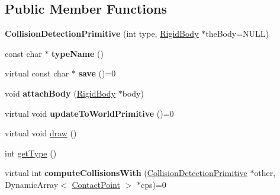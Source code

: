 \subsection*{Public Member Functions}
\begin{DoxyCompactItemize}
\item 
\hypertarget{classCartWheel_1_1Physics_1_1CollisionDetectionPrimitive_a97bb80333715080e870b264d35f5e070}{
{\bfseries CollisionDetectionPrimitive} (int type, \hyperlink{classCartWheel_1_1Physics_1_1RigidBody}{RigidBody} $\ast$theBody=NULL)}
\label{classCartWheel_1_1Physics_1_1CollisionDetectionPrimitive_a97bb80333715080e870b264d35f5e070}

\item 
\hypertarget{classCartWheel_1_1Physics_1_1CollisionDetectionPrimitive_a26a0df4ddcfd5b646eb3e0f49c4cae6d}{
const char $\ast$ {\bfseries typeName} ()}
\label{classCartWheel_1_1Physics_1_1CollisionDetectionPrimitive_a26a0df4ddcfd5b646eb3e0f49c4cae6d}

\item 
\hypertarget{classCartWheel_1_1Physics_1_1CollisionDetectionPrimitive_af38b7f6e33b7c261a0e1a86c3d6c13dd}{
virtual const char $\ast$ {\bfseries save} ()=0}
\label{classCartWheel_1_1Physics_1_1CollisionDetectionPrimitive_af38b7f6e33b7c261a0e1a86c3d6c13dd}

\item 
\hypertarget{classCartWheel_1_1Physics_1_1CollisionDetectionPrimitive_a1849d6063df893f236b7b0936464bd6b}{
void {\bfseries attachBody} (\hyperlink{classCartWheel_1_1Physics_1_1RigidBody}{RigidBody} $\ast$body)}
\label{classCartWheel_1_1Physics_1_1CollisionDetectionPrimitive_a1849d6063df893f236b7b0936464bd6b}

\item 
\hypertarget{classCartWheel_1_1Physics_1_1CollisionDetectionPrimitive_a914554e34e0694ce42c502e0ef5a45d9}{
virtual void {\bfseries updateToWorldPrimitive} ()=0}
\label{classCartWheel_1_1Physics_1_1CollisionDetectionPrimitive_a914554e34e0694ce42c502e0ef5a45d9}

\item 
virtual void \hyperlink{classCartWheel_1_1Physics_1_1CollisionDetectionPrimitive_a26c85561d35a7df8bb48697da9c1cb10}{draw} ()
\item 
int \hyperlink{classCartWheel_1_1Physics_1_1CollisionDetectionPrimitive_a2720a47fe87d1c3dacec7deefced481c}{getType} ()
\item 
\hypertarget{classCartWheel_1_1Physics_1_1CollisionDetectionPrimitive_a2dc2a1e44abb289f6e4c6a5f8a70074a}{
virtual int {\bfseries computeCollisionsWith} (\hyperlink{classCartWheel_1_1Physics_1_1CollisionDetectionPrimitive}{CollisionDetectionPrimitive} $\ast$other, DynamicArray$<$ \hyperlink{classCartWheel_1_1Physics_1_1ContactPoint}{ContactPoint} $>$ $\ast$cps)=0}
\label{classCartWheel_1_1Physics_1_1CollisionDetectionPrimitive_a2dc2a1e44abb289f6e4c6a5f8a70074a}


\end{DoxyCompactItemize}
